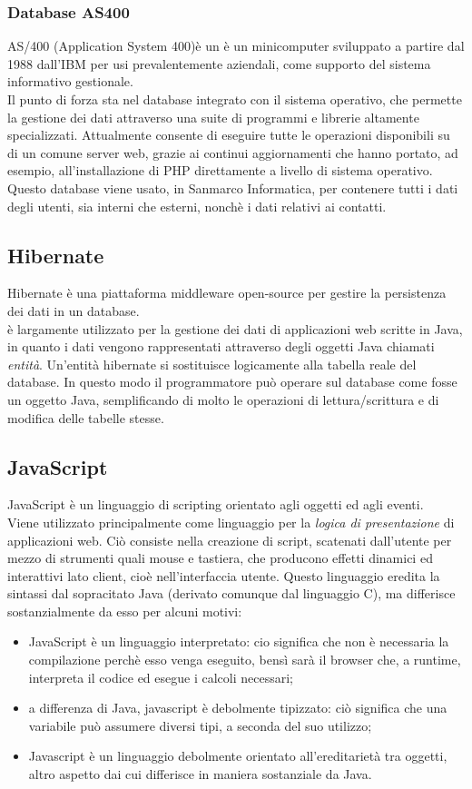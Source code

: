 \subsubsection{Database AS400}
AS/400 (Application System 400)è un è un minicomputer sviluppato a partire dal 1988 dall’IBM per usi prevalentemente aziendali, come supporto del sistema informativo gestionale.\\
Il punto di forza sta nel database integrato con il sistema operativo, che permette la gestione dei dati attraverso una suite di programmi e librerie altamente specializzati. Attualmente consente di eseguire tutte le operazioni disponibili su di un comune server web, grazie ai continui aggiornamenti che hanno portato, ad esempio, all'installazione di PHP direttamente a livello di sistema operativo.
Questo database viene usato, in Sanmarco Informatica, per contenere tutti i dati degli utenti, sia interni che esterni, nonchè i dati relativi ai contatti. %
\subsection{Hibernate}
Hibernate è una piattaforma \gls{middleware} open-source per gestire la persistenza dei dati in un database.\\
è largamente utilizzato per la gestione dei dati di applicazioni web scritte in Java, in quanto i dati vengono rappresentati attraverso degli oggetti Java chiamati \emph{entità}.
Un'entità hibernate si sostituisce logicamente alla tabella reale del database. In questo modo il programmatore può operare sul database come fosse un oggetto Java, semplificando di molto le operazioni di lettura/scrittura e di modifica delle tabelle stesse.
\subsection{JavaScript}
JavaScript è un linguaggio di scripting orientato agli oggetti ed agli eventi.\\
Viene utilizzato principalmente come linguaggio per la \emph{logica di presentazione} di applicazioni web. Ciò consiste nella creazione di \gls{script}, scatenati dall'utente per mezzo di strumenti quali mouse e tastiera, che producono effetti dinamici ed interattivi lato client, cioè nell'interfaccia utente.
Questo linguaggio eredita la sintassi dal sopracitato Java (derivato comunque dal linguaggio C), ma differisce sostanzialmente da esso per alcuni motivi:
\begin{itemize}
	\item JavaScript è un linguaggio interpretato: cio significa che non è necessaria la compilazione perchè esso venga eseguito, bensì sarà il browser che, a runtime, interpreta il codice ed esegue i calcoli necessari;
	\item a differenza di Java, javascript è debolmente tipizzato: ciò significa che una variabile può assumere diversi tipi, a seconda del suo utilizzo;
	\item Javascript è un linguaggio debolmente orientato all'ereditarietà tra oggetti, altro aspetto dai cui differisce in maniera sostanziale da Java. 
\end{itemize}
